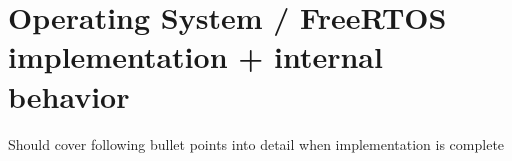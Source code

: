 
\section{Operating System / FreeRTOS implementation + internal behavior}
Should cover following bullet points into detail when implementation is complete

